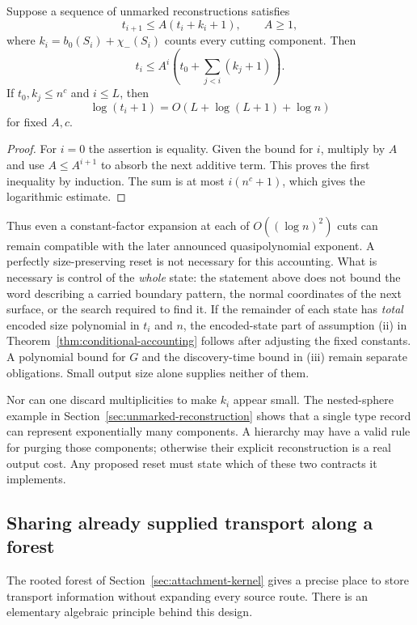 \begin{proposition}
\label{prop:reset-recurrence}
Suppose a sequence of unmarked reconstructions satisfies
\[
 t_{i+1}\leq A(t_i+k_i+1),\qquad A\geq1,
\]
where $k_i=b_0(S_i)+\chi_-(S_i)$ counts every cutting component.
Then
\[
 t_i\leq A^i\left(t_0+\sum_{j<i}(k_j+1)\right).
\]
If $t_0,k_j\leq n^c$ and $i\leq L$, then
\[
 \log(t_i+1)=O(L+\log(L+1)+\log n)
\]
for fixed $A,c$.
\end{proposition}
\begin{proof}
For $i=0$ the assertion is equality.  Given the bound for $i$, multiply
by $A$ and use $A\leq A^{i+1}$ to absorb the next additive term.  This
proves the first inequality by induction.  The sum is at most
$i(n^c+1)$, which gives the logarithmic estimate.
\end{proof}

Thus even a constant-factor expansion at each of
$O((\log n)^2)$ cuts can remain compatible with the later announced
quasipolynomial exponent.  A perfectly size-preserving reset is not
necessary for this accounting.  What is necessary is control of the
\emph{whole} state: the statement above does not bound the word describing
a carried boundary pattern, the normal coordinates of the next surface,
or the search required to find it.  If the remainder of each state has
\emph{total} encoded size polynomial in $t_i$ and $n$, the encoded-state
part of assumption (ii) in Theorem~\ref{thm:conditional-accounting} follows
after adjusting the fixed constants.  A polynomial bound for $G$ and the
discovery-time bound in (iii) remain separate obligations.  Small output
size alone supplies neither of them.

Nor can one discard multiplicities to make $k_i$ appear small.  The
nested-sphere example in Section~\ref{sec:unmarked-reconstruction} shows
that a single type record can represent exponentially many components.
A hierarchy may have a valid rule for purging those components; otherwise
their explicit reconstruction is a real output cost.  Any proposed reset
must state which of these two contracts it implements.

\subsection{Sharing already supplied transport along a forest}

The rooted forest of Section~\ref{sec:attachment-kernel} gives a precise
place to store transport information without expanding every source route.
There is an elementary algebraic principle behind this design.

